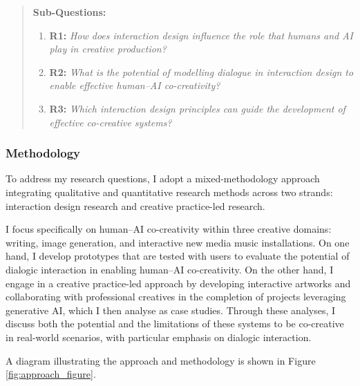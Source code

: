 \begin{quote}
\textbf{Sub-Questions:}
\begin{enumerate}
    \item \textbf{R1:} \emph{How does interaction design influence the role that humans and AI play in creative production?}
    \item \textbf{R2:} \emph{What is the potential of modelling dialogue in interaction design to enable effective human–AI co-creativity?}
    \item \textbf{R3:} \emph{Which interaction design principles can guide the development of effective co-creative systems?}
\end{enumerate}
\end{quote}

\subsubsection{Methodology}
To address my research questions, I adopt a mixed-methodology approach integrating qualitative and quantitative research methods across two strands: interaction design research and creative practice-led research.

I focus specifically on human–AI co-creativity within three creative domains: writing, image generation, and interactive new media music installations. On one hand, I develop prototypes that are tested with users to evaluate the potential of dialogic interaction in enabling human–AI co-creativity. On the other hand, I engage in a creative practice-led approach by developing interactive artworks and collaborating with professional creatives in the completion of projects leveraging generative AI, which I then analyse as case studies. Through these analyses, I discuss both the potential and the limitations of these systems to be co-creative in real-world scenarios, with particular emphasis on dialogic interaction.

A diagram illustrating the approach and methodology is shown in Figure \ref{fig:approach_figure}.


